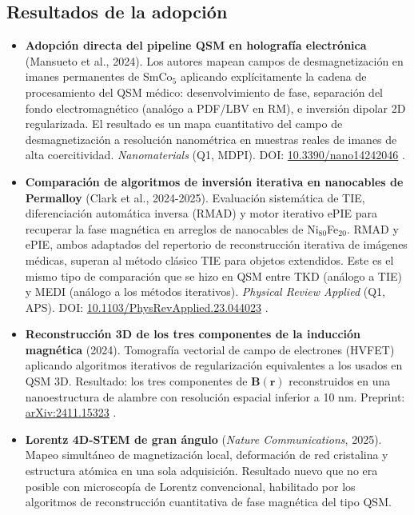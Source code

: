 \documentclass[12pt, a4paper]{article}
\begin{document}
\subsection{Resultados de la adopción}

\begin{itemize}[leftmargin=2em, itemsep=5pt]

  \item \textbf{Adopción directa del pipeline QSM en holografía electrónica} (Mansueto et al., 2024). Los autores mapean campos de desmagnetización en imanes permanentes de SmCo$_5$ aplicando explícitamente la cadena de procesamiento del QSM médico: desenvolvimiento de fase, separación del fondo electromagnético (analógo a PDF/LBV en RM), e inversión dipolar 2D regularizada. El resultado es un mapa cuantitativo del campo de desmagnetización a resolución nanométrica en muestras reales de imanes de alta coercitividad. \emph{Nanomaterials} (Q1, MDPI). DOI: \href{https://doi.org/10.3390/nano14242046}{10.3390/nano14242046} \cite{Mansueto2024Holography}.

  \item \textbf{Comparación de algoritmos de inversión iterativa en nanocables de Permalloy} (Clark et al., 2024-2025). Evaluación sistemática de TIE, diferenciación automática inversa (RMAD) y motor iterativo ePIE para recuperar la fase magnética en arreglos de nanocables de Ni$_{80}$Fe$_{20}$. RMAD y ePIE, ambos adaptados del repertorio de reconstrucción iterativa de imágenes médicas, superan al método clásico TIE para objetos extendidos. Este es el mismo tipo de comparación que se hizo en QSM entre TKD (análogo a TIE) y MEDI (análogo a los métodos iterativos). \emph{Physical Review Applied} (Q1, APS). DOI: \href{https://doi.org/10.1103/PhysRevApplied.23.044023}{10.1103/PhysRevApplied.23.044023} \cite{Ltz4DSTEM2024}.

  \item \textbf{Reconstrucción 3D de los tres componentes de la inducción magnética} (2024). Tomografía vectorial de campo de electrones (HVFET) aplicando algoritmos iterativos de regularización equivalentes a los usados en QSM 3D. Resultado: los tres componentes de $\mathbf{B}(\mathbf{r})$ reconstruidos en una nanoestructura de alambre con resolución espacial inferior a 10 nm. Preprint: \href{https://arxiv.org/abs/2411.15323}{arXiv:2411.15323} \cite{NanowireIterative2024}.

  \item \textbf{Lorentz 4D-STEM de gran ángulo} (\emph{Nature Communications}, 2025). Mapeo simultáneo de magnetización local, deformación de red cristalina y estructura atómica en una sola adquisición. Resultado nuevo que no era posible con microscopía de Lorentz convencional, habilitado por los algoritmos de reconstrucción cuantitativa de fase magnética del tipo QSM.


\end{itemize}
\end{document}
